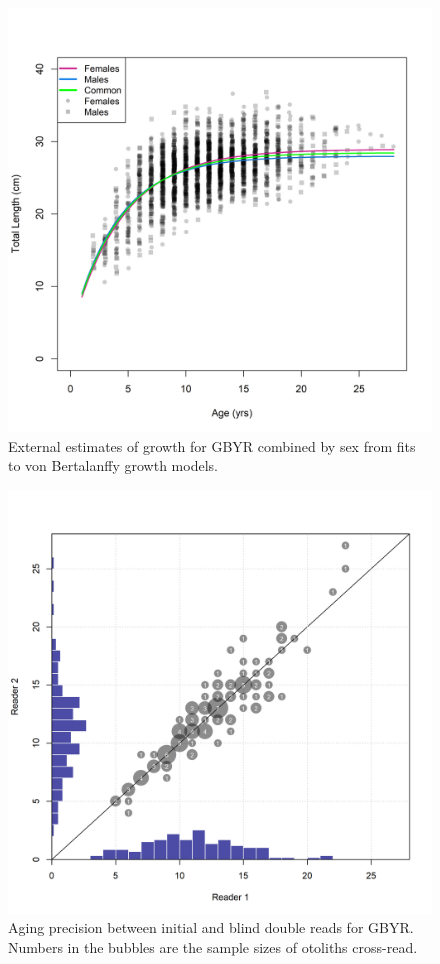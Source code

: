 \documentclass[12pt,]{article}
\begin{document}
\begin{figure}
\centering
\includegraphics{Figures/Growth_by_sex.png}
\caption{External estimates of growth for GBYR combined by sex from fits
to von Bertalanffy growth models. \label{Growth_by_sex}}
\end{figure}

\FloatBarrier

\begin{figure}
\centering
\includegraphics{Figures/GBY_age_error.png}
\caption{Aging precision between initial and blind double reads for
GBYR. Numbers in the bubbles are the sample sizes of otoliths
cross-read. \label{fig:GBY_age_error}}
\end{figure}
\end{document}
